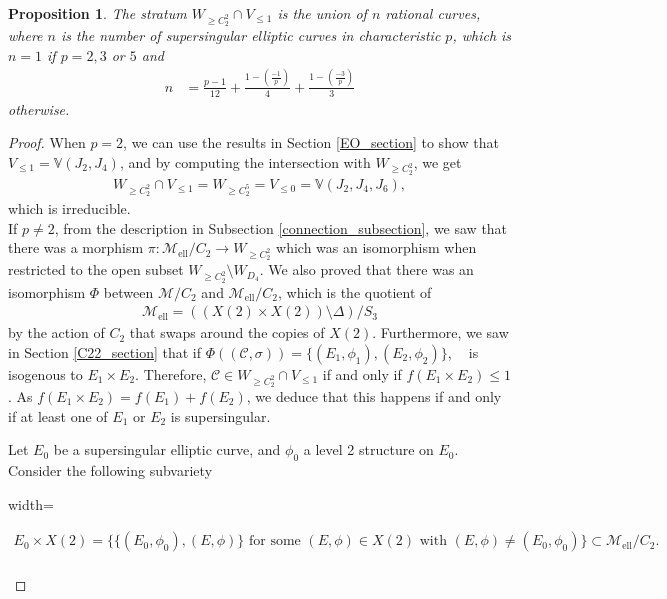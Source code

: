 \documentclass{amsart}
\newcommand{\calC}{\mathcal{C}}
\DeclareMathOperator{\Jac}{Jac}
\DeclareMathOperator{\Jacc}{\Jac(\mathcal{C})}
\newcommand{\mell}{\mathcal{M}_{\text{ell}}}
\newcommand{\mells}{\mathcal{M}_{\text{ell}}/C_2}
\newcommand{\mquot}{\mathcal{M}/C_2}
\numberwithin{equation}{section}
\newtheorem{proposition}[theorem]{Proposition}
\theoremstyle{definition}
\theoremstyle{remark}
\begin{document}
\begin{proposition}
The stratum $W_{\geq C_2^2} \cap V_{\leq 1}$ is the union of $n$ rational curves, where $n$ is the number of supersingular elliptic curves in characteristic $p$, which is $n=1$ if $p=2,3$ or $5$ and
\begin{align*}
n&=\frac{p-1}{12}+\frac{1-\left(\frac{-1}{p}\right)}{4}+\frac{1-\left(\frac{-3}{p}\right)}{3}
\end{align*}
otherwise.
\end{proposition}
\begin{proof}
When $p=2$, we can use the results in Section \ref{EO_section} to show that $V_{\leq 1}=\mathbb{V}(J_2,J_4)$, and by computing the intersection with $W_{\geq C_2^2}$, we get 
\begin{align*}
W_{\geq C_2^2} \cap V_{\leq 1}=W_{\geq C_2^5}=V_{\leq0}=\mathbb{V}(J_2,J_4,J_6),
\end{align*} 
which is irreducible.\\

If $p\neq2$, from the description in Subsection \ref{connection_subsection}, we saw that there was a morphism $\pi:\mells\rightarrow W_{\geq C_2^2}$ which was an isomorphism when restricted to the open subset $W_{\geq C_2^2}\setminus W_{D_4}$. We also proved that there was an isomorphism $\Phi$ between $\mquot$ and $\mells$, which is the quotient of 
\begin{align*}
\mell=((X(2)\times X(2))\setminus\Delta)/S_3
\end{align*}
by the action of $C_2$ that swaps around the copies of $X(2)$. Furthermore, we saw in Section \ref{C22_section} that if $\Phi((\calC,\sigma))=\{(E_1,\phi_1),(E_2,\phi_2)\}$, $\Jacc$ is isogenous to $E_1\times E_2$. Therefore, $\calC\in W_{\geq C_2^2} \cap V_{\leq 1}$ if and only if $f(E_1\times E_2)\leq1$.  As $f(E_1\times E_2)=f(E_1)+f(E_2)$, we deduce that this happens if and only if at least one of $E_1$ or $E_2$ is supersingular. 

Let $E_0$ be a supersingular elliptic curve, and $\phi_0$ a level 2 structure on $E_0$.
Consider the following subvariety\\
\begin{adjustbox}{width=\textwidth}
\begin{minipage}{1.1\textwidth}
\begin{align*}
E_0\times X(2)=\{\{(E_0,\phi_0),(E,\phi)\} \text{ for some }(E,\phi) \in X(2) \text{ with } (E,\phi) \neq(E_0,\phi_0)\}\subset\mells.\\
\end{align*}
\end{minipage}
\end{adjustbox}


\end{proof}
\end{document}

